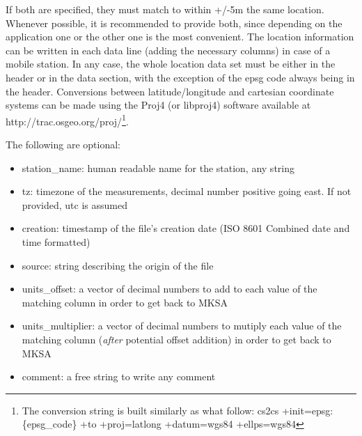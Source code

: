 \documentclass[a4paper,10pt]{article}
\begin{document}
If both are specified, they must match to within +/-5m the same location. Whenever possible, it is recommended to provide both, since depending on the application one or the other one is the most convenient. The location information can be written in each data line (adding the necessary columns) in case of a mobile station. In any case, the whole location data set must be either in the header or in the data section, with the exception of the epsg code always being in the header. Conversions between latitude/longitude and cartesian coordinate systems can be made using the Proj4 (or libproj4) software available at http://trac.osgeo.org/proj/\footnote{The conversion string is built similarly as what follow: cs2cs +init=epsg:\{epsg\_code\} +to +proj=latlong +datum=wgs84 +ellps=wgs84}.

The following are optional:
\begin{itemize}
	\item station\_name: human readable name for the station, any string
	\item tz: timezone of the measurements, decimal number positive going east. If not provided, utc is assumed
	\item creation: timestamp of the file's creation date (ISO 8601 Combined date and time formatted)
	\item source: string describing the origin of the file
	\item units\_offset: a vector of decimal numbers to add to each value of the matching column in order to get back to MKSA
	\item units\_multiplier: a vector of decimal numbers to mutiply each value of the matching column (\emph{after} potential offset addition) in order to get back to MKSA
	\item comment: a free string to write any comment
\end{itemize}
\end{document}
